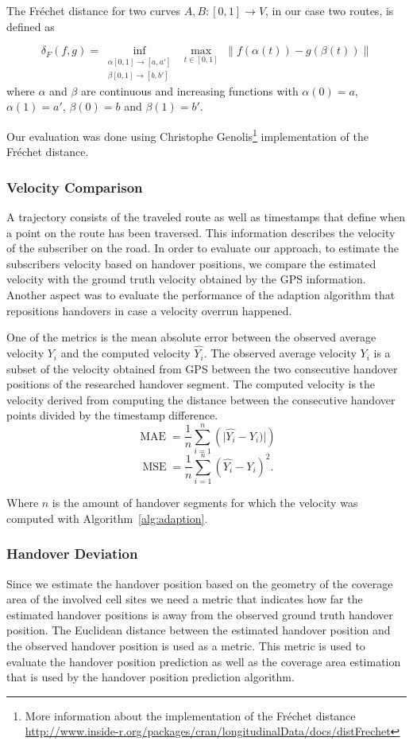 \documentclass[twocolumn]{bmcart}%
\begin{document}
The Fr\'{e}chet distance for two curves $A,B:[0,1]\rightarrow V$, in our case two routes, is defined as 


\[\delta_F(f,g)=\inf_{\substack{\alpha [0,1] \rightarrow [a,a'] \\\beta [0,1] \rightarrow [b,b']} }\,\, \max_{t \in [0,1]} \,\, \lVert f(\alpha(t))-g(\beta(t)) \rVert\]
where $\alpha$ and $\beta$ are continuous and increasing functions with $\alpha(0)=a$, $\alpha(1)=a'$, $\beta(0)=b$ and $\beta(1)=b'$. 

Our evaluation was done using Christophe Genolis\footnote{More information about the implementation of the Fr\'{e}chet distance \url{http://www.inside-r.org/packages/cran/longitudinalData/docs/distFrechet}} implementation of the Fr\'{e}chet distance.

\subsubsection*{Velocity Comparison}
A trajectory consists of the traveled route as well as timestamps that define when a point on the route has been traversed. This information describes the velocity of the subscriber on the road. In order to evaluate our approach, to estimate the subscribers velocity based on handover positions, we compare the estimated velocity with the ground truth velocity obtained by the GPS information. Another aspect was to evaluate the performance of the adaption algorithm that repositions handovers in case a velocity overrun happened.

One of the metrics is the mean absolute error between the observed average velocity $ Y_i$  and the computed velocity $ \hat{Y_i}$. The observed average velocity $Y_i$ is a subset of the velocity obtained from GPS between the two consecutive handover positions of the researched handover segment. The computed velocity is the velocity derived from computing the distance between the consecutive handover points divided by the timestamp difference.
\[\operatorname{MAE}  = \frac{1}{n}\sum_{i=1}^{n} \left(\lvert \hat{Y_i} - Y_i) \rvert \right)\]
\[\operatorname{MSE}=\frac{1}{n}\sum_{i=1}^n(\hat{Y_i} - Y_i)^2.\]

Where $n$ is the amount of handover segments for which the velocity was computed with Algorithm~\ref{alg:adaption}.
\subsubsection*{Handover Deviation}
Since we estimate the handover position based on the geometry of the coverage area of the involved cell sites we need a metric that indicates how far the estimated handover positions is away from the observed ground truth handover position. The Euclidean distance between the estimated handover position and the observed handover position is used as a metric. This metric is used to evaluate the handover position prediction as well as the coverage area estimation that is used by the handover position prediction algorithm.
\end{document}
